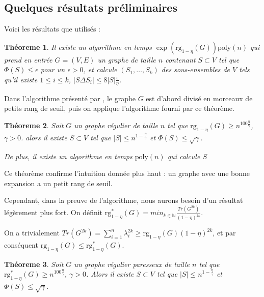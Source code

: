 \documentclass[a4paper,10pt]{article}
\theoremstyle{plain}
\newtheorem{theo}{Théoreme}
\theoremstyle{Definition}
\theoremstyle{remark}
\newcommand{\rg}{\mathrm{rg}}
\newcommand{\poly}{\mathrm{poly}}
\begin{document}
\subsection{Quelques résultats préliminaires}

Voici les résultats que utilisés :

\begin{theo}
Il existe un algorithme en temps $\exp(\rg_{1-\eta}(G))\poly(n)$ qui prend
en entrée $G=(V,E)$ un graphe de taille $n$ contenant $S \subset V$ tel que
$\Phi(S) \leq \epsilon$ pour un $\epsilon > 0$, et calcule
$(S_1,\dots,S_k)$ des sous-ensembles de $V$ tels qu'il existe $1\leq i\leq
k$, $|S \Delta S_i| \leq 8|S|\frac{\epsilon}{\eta}$.
\label{algo}
\end{theo}

Dans l'algorithme présenté par \cite{St10}, le graphe $G$ est d'abord
divisé en morceaux de petits rang de seuil, puis on applique l'algorithme
fourni par ce théorème.

\begin{theo}
Soit $G$ un graphe régulier de taille $n$ tel que $\rg_{1 - \eta}(G) \geq
n^{100\frac{\eta}{\gamma}}$, $\gamma >0$. alors il existe $S \subset V$ tel
que $|S| \leq n^{1 - \frac{\eta}{\gamma}}$ et $\Phi(S) \leq \sqrt{\gamma}$.

De plus, il existe un algorithme en temps $\poly(n)$ qui calcule $S$
\label{rg}
\end{theo}

Ce théorème confirme l'intuition donnée plus haut : un graphe avec une
bonne expansion a un petit rang de seuil.

\vspace{0.5cm}

Cependant, dans la preuve de l'algorithme, nous aurons besoin d'un résultat
légèrement plus fort. On définit $\displaystyle \rg^*_{1- \eta}(G) = min_{k
  \in {\mathbb N}}\frac{Tr(G^{2k})}{(1-\eta)^{2k}}$.

On a trivialement $\displaystyle Tr(G^{2k}) = \sum_{i=1}^n \lambda_i^{2k}
\geq \rg_{1-\eta}(G)(1-\eta)^{2k}$, et par conséquent $\rg_{1-\eta}(G) \leq
\rg^*_{1-\eta}(G)$.

\begin{theo}
Soit $G$ un graphe régulier paresseux de taille $n$ tel que $\rg^*_{1 -
  \eta}(G) \geq n^{100\frac{\eta}{\gamma}}$, $\gamma >0$. Alors il existe
$S \subset V$ tel que $|S| \leq n^{1 - \frac{\eta}{\gamma}}$ et $\Phi(S)
\leq \sqrt{\gamma}$.
\label{rg*}
\end{theo}
\end{document}
